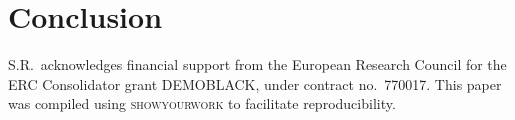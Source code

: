 \documentclass[aps,prd,twocolumn,superscriptaddress,preprintnumbers,nofootinbib,hidelinks]{revtex4-2}
\begin{document}


\section{Conclusion}
\label{sec:conclusion}

\begin{acknowledgments}

S.R.~acknowledges financial support from the European Research Council for the ERC Consolidator grant DEMOBLACK, under contract no.~770017.
This paper was compiled using \textsc{showyourwork} \cite{Luger2021} to facilitate reproducibility.

\end{acknowledgments}


\end{document}
